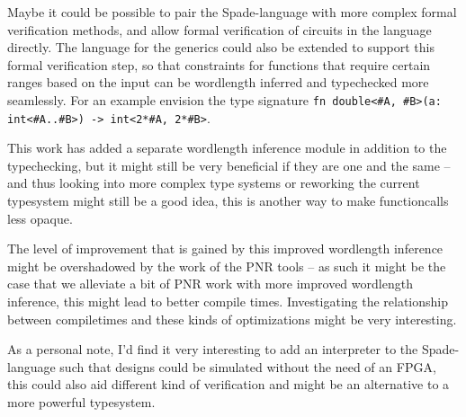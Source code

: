 Maybe it could be possible to pair the Spade-language with more complex formal verification methods, and allow formal verification of circuits in the language directly. The language for the generics could also be extended to support this formal verification step, so that constraints for functions that require certain ranges based on the input can be wordlength inferred and typechecked more seamlessly. For an example envision the type signature \verb+fn double<#A, #B>(a: int<#A..#B>) -> int<2*#A, 2*#B>+.

This work has added a separate wordlength inference module in addition to the typechecking, but it might still be very beneficial if they are one and the same -- and thus looking into more complex type systems or reworking the current typesystem might still be a good idea, this is another way to make functioncalls less opaque.

The level of improvement that is gained by this improved wordlength inference might be overshadowed by the work of the PNR tools -- as such it might be the case that we alleviate a bit of PNR work with more improved wordlength inference, this might lead to better compile times. Investigating the relationship between compiletimes and these kinds of optimizations might be very interesting.

As a personal note, I'd find it very interesting to add an interpreter to the Spade-language such that designs could be simulated without the need of an FPGA, this could also aid different kind of verification and might be an alternative to a more powerful typesystem.
